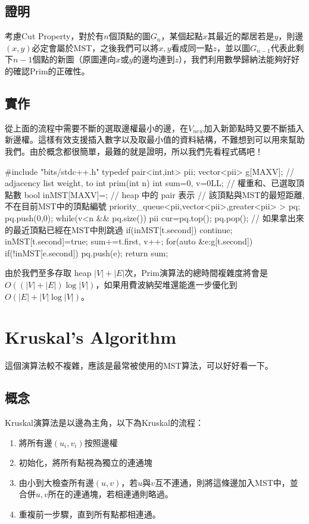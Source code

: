 \subsection{證明}
考慮Cut Property，對於有$n$個頂點的圖$G_n$，某個起點$x$其最近的鄰居若是$y$，則邊$(x,y)$必定會屬於MST，之後我們可以將$x,y$看成同一點$z$，並以圖$G_{n-1}$代表此剩下$n-1$個點的新圖（原圖連向$x$或$y$的邊均連到$z$），我們利用數學歸納法能夠好好的確認Prim的正確性。
\subsection{實作}
從上面的流程中需要不斷的選取邊權最小的邊，在$V_{new}$加入新節點時又要不斷插入新邊權。這樣有效支援插入數字以及取最小值的資料結構，不難想到可以用來幫助我們。由於概念都很簡單，最難的就是證明，所以我們先看程式碼吧！

\begin{C++}
#include "bits/stdc++.h"
typedef pair<int,int> pii;
vector<pii> g[MAXV]; // adjacency list {weight, to}
int prim(int n){
    int sum=0, v=0LL; // 權重和、已選取頂點數
    bool inMST[MAXV]={};
    // heap 中的 pair 表示
    // {該頂點與MST的最短距離, 不在目前MST中的頂點編號}
    priority_queue<pii,vector<pii>,greater<pii> > pq;
    pq.push({0,0});
    while(v<n && pq.size()){
        pii cur=pq.top(); pq.pop();
        // 如果拿出來的最近頂點已經在MST中則跳過
        if(inMST[t.second]) continue;
        inMST[t.second]=true;
        sum+=t.first, v++;
        for(auto &e:g[t.second]) {
        	if(!inMST[e.second]) pq.push(e);
        }
    }
    return sum;
}
\end{C++}
由於我們至多存取 heap $|V|+|E|$次，Prim演算法的總時間複雜度將會是$O((|V|+|E|)\log|V|)$，如果用費波納契堆還能進一步優化到$O(|E|+|V|\log|V|)$。
\section{Kruskal's Algorithm}
這個演算法較不複雜，應該是最常被使用的MST算法，可以好好看一下。
\subsection{概念}
Kruskal演算法是以邊為主角，以下為Kruskal的流程：
\begin{enumerate}
\item 將所有邊$(u_i,v_i)$按照邊權
\item 初始化，將所有點視為獨立的連通塊
\item 由小到大檢查所有邊$(u,v)$，若$u$與$v$互不連通，則將這條邊加入MST中，並合併$u,v$所在的連通塊，若相連通則略過。
\item 重複前一步驟，直到所有點都相連通。
\end{enumerate}
